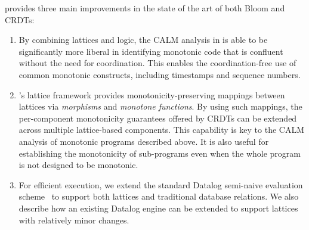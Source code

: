 \lang provides three main improvements in the state of the art of both Bloom and CRDTs:  
\begin{enumerate}
\item By combining lattices and logic, the CALM analysis in \lang is able to be
  significantly more liberal in identifying monotonic code that is confluent
  without the need for coordination.  This enables the coordination-free use of
  common monotonic constructs, including timestamps and sequence numbers.

\item {\lang}'s lattice framework provides monotonicity-preserving mappings
  between lattices via \emph{morphisms} and \emph{monotone functions}.  By using
  such mappings, the per-component monotonicity guarantees offered by CRDTs can
  be extended across multiple lattice-based components.  This capability is key
  to the CALM analysis of monotonic \lang programs described above.  It is also
  useful for establishing the monotonicity of sub-programs even when the whole
  program is not designed to be monotonic.

\item For efficient execution, we extend the standard Datalog semi-naive
  evaluation scheme~\cite{Balbin1987} to support both lattices and traditional
  database relations. We also describe how an existing Datalog engine can be
  extended to support lattices with relatively minor changes.
\end{enumerate}

% 


